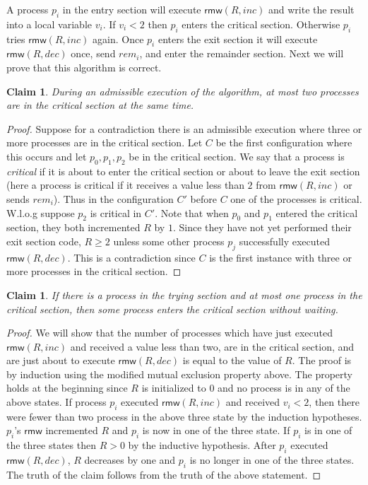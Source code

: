 \documentclass[11pt]{article}
\newcommand\rmw{\mathsf{rmw}}
\newtheorem{claim}[theorem]{Claim}
\begin{document}
A process $p_i$ in the entry section will execute $\rmw(R, inc)$ and write the result into a local variable $v_i$. If $v_i < 2$ then $p_i$ enters the critical section. Otherwise $p_i$ tries $\rmw(R, inc)$ again. Once $p_i$ enters the exit section it will execute $\rmw(R, dec)$ once, send $rem_i$, and enter the remainder section. Next we will prove that this algorithm is correct.

\begin{claim}
During an admissible execution of the algorithm, at most two processes are in the critical section at the same time.
\end{claim}
\begin{proof}
Suppose for a contradiction there is an admissible execution where three or more processes are in the critical section. Let $C$ be the first configuration where this occurs and let $p_0, p_1, p_2$ be in the critical section. We say that a process is \emph{critical} if it is about to enter the critical section or about to leave the exit section (here a process is critical if it receives a value less than $2$ from $\rmw(R, inc)$ or sends $rem_i$). Thus in the configuration $C'$ before $C$ one of the processes is critical. W.l.o.g suppose $p_2$ is critical in $C'$. Note that when $p_0$ and $p_1$ entered the critical section, they both incremented $R$ by $1$. Since they have not yet performed their exit section code, $R \geq 2$ unless some other process $p_j$ successfully executed $\rmw(R, dec)$. This is a contradiction since $C$ is the first instance with three or more processes in the critical section.
\end{proof}


\begin{claim}
If there is a process in the trying section and at most one process in the critical section, then some process enters the critical section without waiting.
\end{claim}
\begin{proof}
We will show that the number of processes which have just executed $\rmw(R, inc)$ and received a value less than two, are in the critical section, and are just about to execute $\rmw(R, dec)$ is equal to the value of $R$. The proof is by induction using the modified mutual exclusion property above. The property holds at the beginning since $R$ is initialized to $0$ and no process is in any of the above states. If process $p_i$ executed $\rmw(R, inc)$ and received $v_i < 2$, then there were fewer than two process in the above three state by the induction hypotheses. $p_i$'s $\rmw$ incremented $R$ and $p_i$ is now in one of the three state. If $p_i$ is in one of the three states then $R > 0$ by the inductive hypothesis. After $p_i$ executed $\rmw(R, dec)$, $R$ decreases by one and $p_i$ is no longer in one of the three states. The truth of the claim follows from the truth of the above statement. 
\end{proof} 
\end{document}
